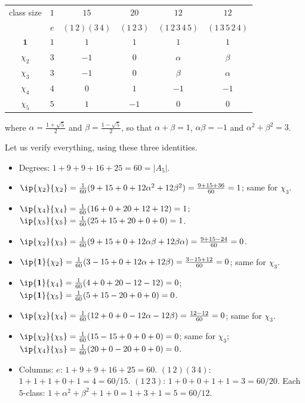 \begin{center}
\renewcommand{\arraystretch}{1.35}
\setlength{\tabcolsep}{9pt}
\begin{tabular}{c|ccccc}
\toprule
class size & $1$ & $15$ & $20$ & $12$ & $12$\\
 & $e$ & $(1\,2)(3\,4)$ & $(1\,2\,3)$ & $(1\,2\,3\,4\,5)$ & $(1\,3\,5\,2\,4)$\\
\midrule
$\mathbf 1$ & $1$ & $1$ & $1$ & $1$ & $1$\\
$\chi_2$ & $3$ & $-1$ & $0$ & $\alpha$ & $\beta$\\
$\chi_3$ & $3$ & $-1$ & $0$ & $\beta$ & $\alpha$\\
$\chi_4$ & $4$ & $0$ & $1$ & $-1$ & $-1$\\
$\chi_5$ & $5$ & $1$ & $-1$ & $0$ & $0$\\
\bottomrule
\end{tabular}
\end{center}
where $\alpha = \frac{1+\sqrt5}2$ and $\beta = \frac{1-\sqrt5}2$, so that $\alpha+\beta = 1$, $\alpha\beta = -1$ and $\alpha^2+\beta^2 = 3$.

Let us verify everything, using these three identities.
\begin{itemize}
	\item Degrees: $1 + 9 + 9 + 16 + 25 = 60 = |A_5|$.
	\item $\ip{\chi_2}{\chi_2} = \frac1{60}(9 + 15 + 0 + 12\alpha^2 + 12\beta^2) = \frac{9+15+36}{60} = 1$; same for $\chi_3$.
	\item $\ip{\chi_4}{\chi_4} = \frac1{60}(16 + 0 + 20 + 12 + 12) = 1$; \; $\ip{\chi_5}{\chi_5} = \frac1{60}(25 + 15 + 20 + 0 + 0) = 1$.
	\item $\ip{\chi_2}{\chi_3} = \frac1{60}(9 + 15 + 0 + 12\alpha\beta + 12\beta\alpha) = \frac{9+15-24}{60} = 0$.
	\item $\ip{\mathbf1}{\chi_2} = \frac1{60}(3 - 15 + 0 + 12\alpha + 12\beta) = \frac{3-15+12}{60}=0$; same for $\chi_3$.
	\item $\ip{\mathbf1}{\chi_4} = \frac1{60}(4+0+20-12-12) = 0$; \; $\ip{\mathbf1}{\chi_5} = \frac1{60}(5+15-20+0+0)=0$.
	\item $\ip{\chi_2}{\chi_4} = \frac1{60}(12 + 0 + 0 - 12\alpha - 12\beta) = \frac{12-12}{60} = 0$; same for $\chi_3$.
	\item $\ip{\chi_2}{\chi_5} = \frac1{60}(15 - 15 + 0 + 0 + 0)=0$; same for $\chi_3$; \; $\ip{\chi_4}{\chi_5} = \frac1{60}(20 + 0 - 20 + 0 + 0) = 0$.
	\item Columns: $e$: $1+9+9+16+25 = 60$. \;$(1\,2)(3\,4)$: $1+1+1+0+1 = 4 = 60/15$. \;$(1\,2\,3)$: $1+0+0+1+1 = 3 = 60/20$. \;Each $5$-class: $1 + \alpha^2+\beta^2+1+0 = 1+3+1 = 5 = 60/12$.
\end{itemize}


